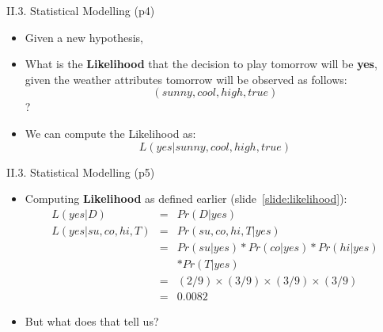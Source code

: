 \documentclass[handout]{beamer}
\newcommand{\strong}[1]{\textbf{\color{teal} #1}}
\newcommand{\stronger}[1]{\textbf{\color{purple} #1}}
\begin{document}
\begin{frame}{II.3. Statistical Modelling (p4)}
\begin{itemize}
\item Given a new hypothesis,
\item[] What is the \strong{Likelihood} that the decision to play tomorrow will be \textbf{yes}, given 
the weather attributes tomorrow will be observed as follows: 
\[
	( sunny, cool, high, true )
\]
?
\item We can compute the Likelihood as:
\[
	L( yes | sunny, cool, high, true )
\]
\end{itemize}
\end{frame}
\begin{frame}{II.3. Statistical Modelling (p5)}
\begin{itemize}
\item Computing \stronger{Likelihood} as defined earlier (slide~\ref{slide:likelihood}):
\[
\begin{array}{rcl}
	L( yes | D ) & = & Pr( D | yes ) \\
	L( yes | su, co, hi, T ) & = & Pr( su, co, hi, T | yes ) \\
    	& = & Pr( su | yes ) * Pr( co | yes ) * Pr( hi | yes ) \\
	    &   & * Pr( T | yes ) \\
		& = & (2/9) \times (3/9) \times (3/9) \times (3/9) \\
		& = & 0.0082
\end{array}
\]
\item But what does that tell us?
\end{itemize}
\end{frame}
\end{document}
